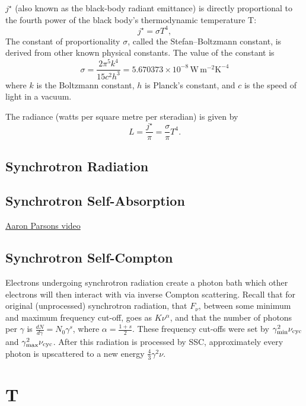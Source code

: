 \documentclass[11pt]{article}
\begin{document}
{$j^{\star}$ (also known as the black-body radiant emittance)
is directly proportional to the fourth power of the black body's
thermodynamic temperature T:
\begin{equation}
 j^{\star} = \sigma T^{4},
\end{equation}
The constant of proportionality $\sigma$, called the Stefan–Boltzmann
constant, is derived from other known physical constants. The value of
the constant is
\begin{equation}
  \sigma ={\frac {2\pi ^{5}k^{4}}{15c^{2}h^{3}}}=5.670373\times 10^{-8} \, \mathrm {W\,m^{-2}K^{-4}} 
\end{equation}
where $k$ is the Boltzmann constant, $h$ is Planck's constant, and $c$ is the speed of light in a vacuum. 

The radiance (watts per square metre per steradian) is given by
\begin{equation}
 L = \frac{j^{\star}}\pi = \frac\sigma\pi T^{4}.
\end{equation}

\subsection*{Synchrotron Radiation}

\subsection*{Synchrotron Self-Absorption}
\href{https://www.youtube.com/watch?v=HeuuX31Cyq0}{Aaron Parsons video}

\subsection*{Synchrotron Self-Compton}
Electrons undergoing synchrotron radiation create a photon bath which
other electrons will then interact with via inverse Compton
scattering. Recall that for original (unprocessed) synchrotron
radiation, that $F_{\nu}$, between some minimum and maximum frequency
cut-off, goes as $K \nu^{\alpha}$, and that the number of photons per
$\gamma$ is $\frac{dN}{d\gamma} = N_{0}\gamma^{s}$, where $\alpha =
\frac{1+s}{2}$. These frequency cut-offs were set by $\gamma _{\rm
min}^2 \nu _{\rm cyc}$ and $\gamma _{\rm max}^2\nu _{\rm cyc}$. After
this radiation is processed by SSC, approximately every photon is
upscattered to a new energy $\frac{4}{3} \gamma^{2}\nu$.

\section*{T} 
}
\end{document}
